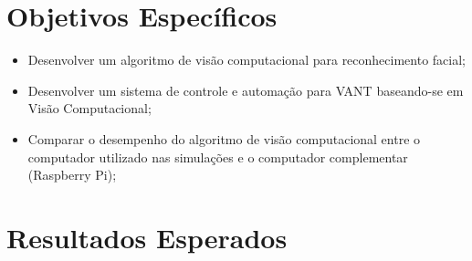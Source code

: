 


\section{Objetivos Específicos}

\begin{itemize}
	\item Desenvolver um algoritmo de visão computacional para reconhecimento facial;
	\item Desenvolver um sistema de controle e automação para VANT baseando-se em Visão Computacional;
	\item Comparar o desempenho do algoritmo de visão computacional entre o computador utilizado nas simulações e o computador complementar (Raspberry Pi);
\end{itemize}

\section{Resultados Esperados}

